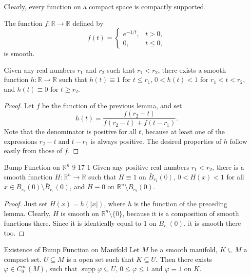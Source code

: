 \documentclass[../main.tex]{subfiles}
\begin{document}
\begin{remark}
    Clearly, every function on a compact space is compactly supported.
\end{remark}

\begin{lemma}{}{}
The function $f: \mathbb{R} \to \mathbb{R}$ defined by
\[
f(t) = \begin{cases}
e^{-1/t}, & t > 0, \\
0, & t \le 0,
\end{cases}
\]
is smooth.
\end{lemma}
\begin{lemma}{}{}
Given any real numbers $r_1$ and $r_2$ such that $r_1 < r_2$, there exists a smooth function $h: \mathbb{R} \to \mathbb{R}$ such that $h(t) \equiv 1$ for $t \le r_1$, $0 < h(t) < 1$ for $r_1 < t < r_2$, and $h(t) \equiv 0$ for $t \ge r_2$.
\end{lemma}
\begin{proof}
Let $f$ be the function of the previous lemma, and set
\[
h(t) = \frac{f(r_2 - t)}{f(r_2 - t) + f(t - r_1)}.
\]Note that the denominator is positive for all $t$, because at least one of the expressions $r_2 - t$ and $t - r_1$ is always positive. The desired properties of $h$ follow easily from those of $f$.
\end{proof}

\begin{lemma}{Bump Function on \(  \mathbb{R} ^{n}  \) }{9-17-1}
Given any positive real numbers $r_1 < r_2$, there is a smooth function $H : \mathbb{R}^n \to \mathbb{R}$ such that $H \equiv 1$ on $\bar{B}_{r_1}(0)$, $0 < H(x) < 1$ for all $x \in B_{r_2}(0) \setminus \bar{B}_{r_1}(0)$, and $H \equiv 0$ on $\mathbb{R}^n \setminus B_{r_2}(0)$.
\end{lemma}

\begin{proof}
Just set $H(x) = h(|x|)$, where $h$ is the function of the preceding lemma. Clearly, $H$ is smooth on $\mathbb{R}^n \setminus \{0\}$, because it is a composition of smooth functions there. Since it is identically equal to 1 on $B_{r_1}(0)$, it is smooth there too. 
\end{proof}

\begin{theorem}{Existence of Bump Function on Manifold}{}
    Let \(  M  \) be a smooth manifold, \(  K\subseteq M  \) a compact set. \(  U\subseteq M  \) is a open set such that \(  K\subseteq U  \). Then there exists \(   \varphi  \in C_{0}^{\infty}\left( M \right)   \), such that \(  \operatorname{supp} \varphi \subseteq U  \), \(  0\le  \varphi \le 1  \) and \(   \varphi \equiv 1  \) on \(  K  \).           
\end{theorem}
\end{document}
